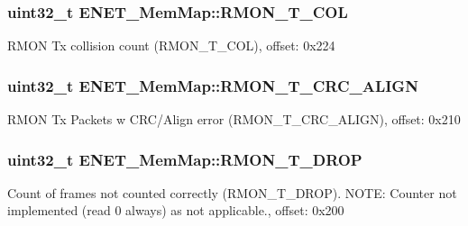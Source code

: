 \subsubsection[{R\+M\+O\+N\+\_\+\+T\+\_\+\+C\+O\+L}]{\setlength{\rightskip}{0pt plus 5cm}uint32\+\_\+t E\+N\+E\+T\+\_\+\+Mem\+Map\+::\+R\+M\+O\+N\+\_\+\+T\+\_\+\+C\+O\+L}\label{struct_e_n_e_t___mem_map_a7d783546e1ce7f9a661f7e0167f4ebcb}
R\+M\+O\+N Tx collision count (R\+M\+O\+N\+\_\+\+T\+\_\+\+C\+O\+L), offset\+: 0x224 \hypertarget{struct_e_n_e_t___mem_map_a91748ae65113321a609bfe426b10dcaf}{}
\subsubsection[{R\+M\+O\+N\+\_\+\+T\+\_\+\+C\+R\+C\+\_\+\+A\+L\+I\+G\+N}]{\setlength{\rightskip}{0pt plus 5cm}uint32\+\_\+t E\+N\+E\+T\+\_\+\+Mem\+Map\+::\+R\+M\+O\+N\+\_\+\+T\+\_\+\+C\+R\+C\+\_\+\+A\+L\+I\+G\+N}\label{struct_e_n_e_t___mem_map_a91748ae65113321a609bfe426b10dcaf}
R\+M\+O\+N Tx Packets w C\+R\+C/\+Align error (R\+M\+O\+N\+\_\+\+T\+\_\+\+C\+R\+C\+\_\+\+A\+L\+I\+G\+N), offset\+: 0x210 \hypertarget{struct_e_n_e_t___mem_map_ad0d6e8aa41799a8c53de16163b293e44}{}
\subsubsection[{R\+M\+O\+N\+\_\+\+T\+\_\+\+D\+R\+O\+P}]{\setlength{\rightskip}{0pt plus 5cm}uint32\+\_\+t E\+N\+E\+T\+\_\+\+Mem\+Map\+::\+R\+M\+O\+N\+\_\+\+T\+\_\+\+D\+R\+O\+P}\label{struct_e_n_e_t___mem_map_ad0d6e8aa41799a8c53de16163b293e44}
Count of frames not counted correctly (R\+M\+O\+N\+\_\+\+T\+\_\+\+D\+R\+O\+P). N\+O\+T\+E\+: Counter not implemented (read 0 always) as not applicable., offset\+: 0x200 \hypertarget{struct_e_n_e_t___mem_map_ae3e453e00c8d5a0bb1438633491306b4}{}
